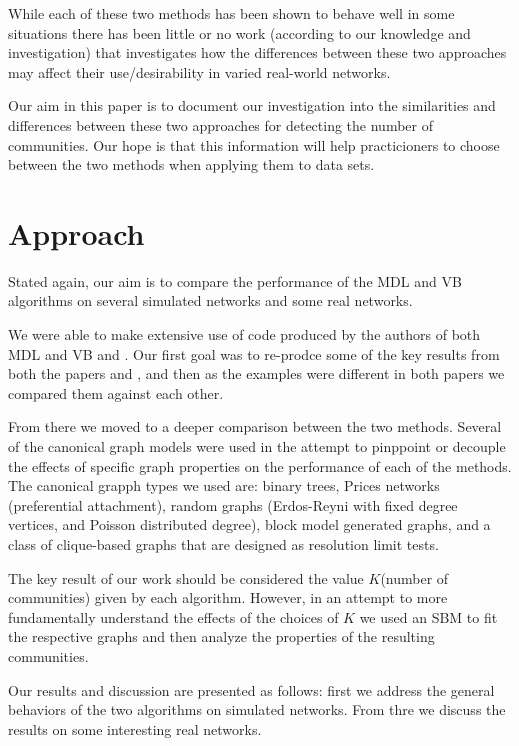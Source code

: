 \documentclass[twocolumn,twoside]{IEEEtran}
\begin{document}
While each of these two methods has been shown to behave well in some situations there has been little or no work (according to our knowledge and investigation) that investigates how the differences between these two approaches may affect their use/desirability in varied real-world networks.

Our aim in this paper is to document our investigation into the similarities and differences between these two approaches for detecting the number of communities. Our hope is that this information will help practicioners to choose between the two methods when applying them to data sets.

\section*{Approach}\label{sec:Approach}
Stated again, our aim is to compare the performance of the MDL and VB algorithms on several simulated networks and some real networks.

We were able to make extensive use of code produced by the authors of both MDL and VB \cite{peixoto_graph-tool_2014} and \cite{Hofman_python_2008}. Our first goal was to re-prodce some of the key results from both the papers \cite{Peixoto2013} and \cite{Hoffman2008}, and then as the examples were different in both papers we compared them against each other.

From there we moved to a deeper comparison between the two methods. Several of the canonical graph models were used in the attempt to pinppoint or decouple the effects of specific graph properties on the performance of each of the methods. The canonical grapph types we used are: binary trees, Prices networks (preferential attachment), random graphs (Erdos-Reyni with fixed degree vertices, and Poisson distributed degree), block model generated graphs, and a class of clique-based graphs that are
designed as resolution limit tests.

The key result of our work should be considered the value $K$(number of communities) given by each algorithm. However, in an attempt to more fundamentally understand the effects of the choices of $K$ we used an SBM to fit the respective graphs and then analyze the properties of the resulting communities.

Our results and discussion are presented as follows: first we address the general behaviors of the two algorithms on simulated networks. From thre we discuss the results on some interesting real networks.
\end{document}
